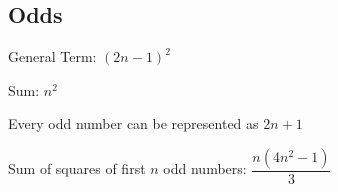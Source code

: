 \subsection{Odds}

General Term: $(2n-1)^2$

Sum: $n^2$

Every odd number can be represented as $2n+1$

Sum of squares of first $n$ odd numbers: $\dfrac{n(4n^2-1)}{3}$